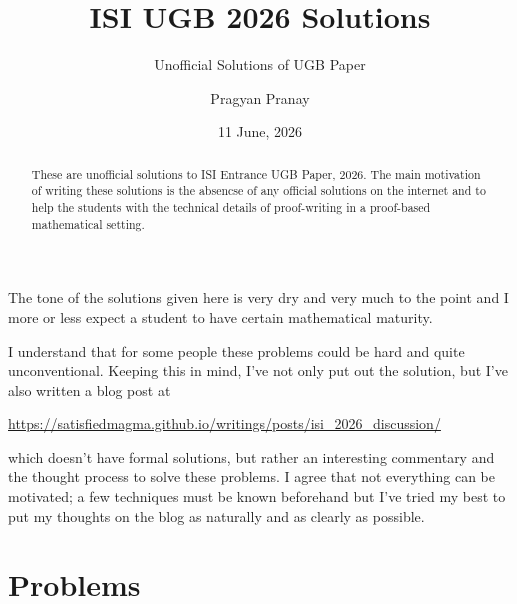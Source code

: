 \documentclass[numbers=endperiod, 11pt]{scrartcl}
\begin{document}
\title{ISI UGB 2026 Solutions}
\subtitle{Unofficial Solutions of UGB Paper}
\author{Pragyan Pranay}
\date{11 June, 2026}
\maketitle

\begin{abstract}
    These are unofficial solutions to ISI Entrance UGB
    Paper, 2026. The main motivation of writing these
    solutions is the absencse of any official solutions
    on the internet and to help the students with the
    technical details of proof-writing in a proof-based
    mathematical setting.
\end{abstract}

The tone of the solutions given here is very dry and
very much to the point and I more or less expect a student
to have certain mathematical maturity.

I understand that for some people these problems could
be hard and quite unconventional. Keeping this in mind, I've
not only put out the solution, but I've also written a blog
post at
\begin{center}
    \small
    \url{https://satisfiedmagma.github.io/writings/posts/isi_2026_discussion/}
\end{center}

\noindent which doesn't have formal solutions, but rather
an interesting commentary and the thought process to solve
these problems. I agree that not everything can be motivated;
a few techniques must be known beforehand but I've tried
my best to put my thoughts on the blog as naturally and
as clearly as possible.

\tableofcontents
\newpage

\section{Problems}
\end{document}
